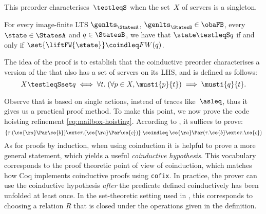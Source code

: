 \noindent
This preorder characterises~$\testleqS$ when the set~$X$ of
servers is a singleton.
\begin{theorem}
\label{thm:coinductive-char-equiv-main}
For every image-finite LTS $\genlts_\StatesA$, $\genlts_\StatesB \in \obaFB$, every
$\state \in \StatesA$ and $\serverB \in \StatesB$, we have that
$\state \testleqS \serverB$ if and only if $\set{\liftFW{\state}} \coindleq
  FW(\serverB)$.
\end{theorem}
%
The idea of the proof is to establish that the coinductive preorder
characterises a version of the \mustpreorder that also has a set of servers on
its LHS, and is defined as follows:
%
\[
  X \testleqSset q \iff \forall t.\; (\forall p \in X, \musti{p}{t}) \implies
  \musti{q}{t}.
\]


Observe that  is based on single actions, instead of
traces like~$\asleq$, thus it gives us a practical proof method.
%
To make this point, we now prove the code hoisting refinement \eqref{eq:mailbox-hoisting}. According
%
to , it suffices to prove:
%
\begin{equation*}
   \{ \tau.(\co{\aa} \Par \co{b}) \extc
   \tau.(\co{\aa} \Par \co{c}) \} \;\coindleq\; \co{\aa} \Par (\tau.\co{b} \extc
   \tau.\co{c})
\end{equation*}
%
As for proofs by induction, when using coinduction it is helpful to prove a
more general statement, which yields a useful \emph{coinductive hypothesis}.
%
This vocabulary corresponds to the proof theoretic point of view of coinduction,
which matches how Coq implements coinductive proofs using \texttt{cofix}.
%
In practice, the prover can use the coinductive hypothesis \emph{after} the
predicate defined coinductively has been unfolded at least once.
%
In the set-theoretic setting used in , this
corresponds to choosing a relation $R$ that is closed under the operations
given in the definition.

